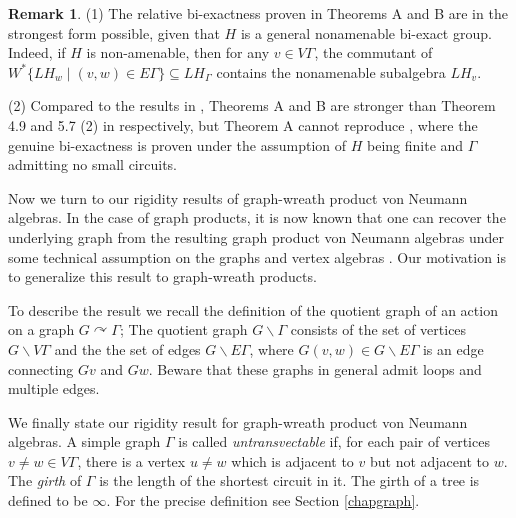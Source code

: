 \documentclass{amsart}
\theoremstyle{definition}
\newtheorem{remark}[theorem]{Remark}
\renewcommand{\subset}{\subseteq}
\newcommand{\action}{\curvearrowright}
\begin{document}
\begin{remark}

(1) The relative bi-exactness proven in Theorems A and B are in the strongest form possible, given that $H$ is a general 
nonamenable bi-exact group. Indeed, if $H$ is non-amenable, then for any $v\in V\Gamma$, the commutant of $W^{\ast}\{LH_w\mid (v,w)\in E\Gamma\}\subset LH_{\Gamma}$ contains the nonamenable subalgebra $LH_v$.  

(2) Compared to the results in \cite{oya2}, Theorems A and B are stronger than Theorem 4.9 and 5.7 (2) in \cite{oya2} respectively, but Theorem A cannot reproduce \cite[Theorem 5.7 (1)]{oya2}, where the genuine bi-exactness is proven under the assumption of $H$ being finite and $\Gamma$ admitting no small circuits. 
\end{remark}

Now we turn to our rigidity results of graph-wreath product von Neumann algebras. 
In the case of graph products, it is now known that one can recover 
the underlying graph from the resulting graph product von Neumann algebras
under some technical assumption on the graphs and vertex algebras  \cite{bcc, hi}. 
Our motivation is to generalize this result to graph-wreath products. 

To describe the result we recall the definition of 
the quotient graph of an action on a graph $G\action \Gamma$;
The quotient graph $G\backslash \Gamma$ consists of the set of vertices $G\backslash V\Gamma$ and the the set of edges $G\backslash E\Gamma$, 
where $G(v,w)\in G\backslash E\Gamma$ is an edge connecting $Gv$ and $Gw$. 
Beware that these graphs in general admit loops and multiple edges. 

We finally state our rigidity result for graph-wreath product von Neumann algebras. 
A simple graph $\Gamma$ is called \emph{untransvectable} 
if, for each pair of vertices $v\neq w\in V\Gamma$, there is a vertex $u\neq w$
which is adjacent to $v$ but not adjacent to $w$. 
The \emph{girth} of $\Gamma$ is the length of the shortest circuit in it. The girth of a tree is defined to be $\infty$. 
For the precise definition see Section \ref{chapgraph}. 
\end{document}
